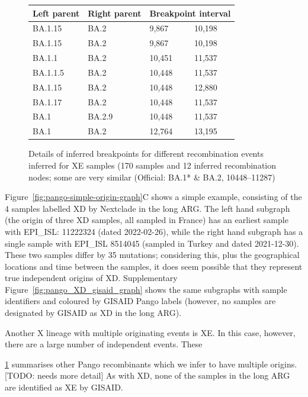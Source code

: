 \documentclass{article}
\begin{document}
\begin{figure}
\centering
\begin{tabular}{llll}
\toprule
Left parent & Right parent & \multicolumn{2}{l}{Breakpoint interval}\\
\midrule
BA.1.15  & BA.2   & 9,867  & 10,198 \\
BA.1.15  & BA.2   & 9,867  & 10,198 \\
BA.1.1   & BA.2   & 10,451 & 11,537 \\
BA.1.1.5 & BA.2   & 10,448 & 11,537 \\
BA.1.15  & BA.2   & 10,448 & 12,880 \\
BA.1.17  & BA.2   & 10,448 & 11,537 \\
BA.1     & BA.2.9 & 10,448 & 11,537 \\
BA.1     & BA.2   & 12,764 & 13,195 \\
\bottomrule
\end{tabular}
\caption{\label{tab:multiple_origins_table}
Details of inferred
breakpoints for different recombination events inferred for XE samples (170
samples and 12 inferred recombination nodes; some are very similar (Official:
BA.1* \& BA.2, 10448–11287)}
\end{figure}

Figure~\ref{fig:pango-simple-origin-graph}C shows a simple example, consisting of
the 4 samples labelled XD by Nextclade in the long ARG. The left hand subgraph
(the origin of three XD samples, all sampled in France) has an earliest
sample with EPI\_ISL: 11222324 (dated 2022-02-26), while the right hand
subgraph has a single sample with EPI\_ISL 8514045 (sampled in Turkey and dated 2021-12-30).
These two samples differ by 35 mutations; considering this, plus the geographical
locations and time between the samples,
it does seem possible that they represent true independent origins of XD.
Supplementary Figure~\ref{fig:pango_XD_gisaid_graph} shows the same subgraphs
with sample identifiers and coloured by GISAID Pango labels (however, no
samples are designated by GISAID as XD in the long ARG).

Another X lineage with multiple originating events is XE. In this case, however,
there are a large number of independent events. These

\ref{tab:multiple_origins_table} summarises other Pango recombinants which
we infer to have multiple origins. [TODO: needs more detail]
As with XD, none of the samples in the long ARG are identified as XE by GISAID.
\end{document}
